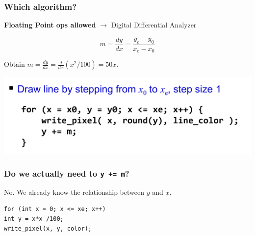 \documentclass{beamer}
\begin{document}
\begin{frame}
    \frametitle{Which algorithm?}

    \textbf{Floating Point ops allowed} $\rightarrow$ Digital Differential Analyzer

    \begin{equation*}
        m = \frac{dy}{dx} = \frac{y_e - y_0}{x_e - x_0}
    \end{equation*}

    Obtain $m = \frac{dy}{dx} = \frac{d}{dx} (x^2/100) = 50x$.

    \begin{center}
        \includegraphics[scale=0.4]{dda-algo.png}
    \end{center}

\end{frame}

\begin{frame}
    \frametitle{Do we actually need to \texttt{y += m}?}

    No. We already know the relationship between $y$ and $x$.

    \vspace{1em}

    \begin{tcolorbox}
        \texttt{for (int x = 0; x <= xe; x++) \\
        \hspace{1em} int y = x*x /100;\\
        \hspace{1em} write\_pixel(x, y, color);}
    \end{tcolorbox}

\end{frame}
\end{document}
